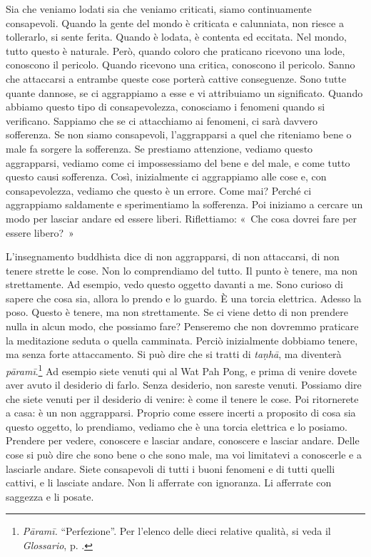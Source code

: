 Sia che veniamo lodati sia che veniamo criticati, siamo continuamente
consapevoli. Quando la gente del mondo è criticata e calunniata, non
riesce a tollerarlo, si sente ferita. Quando è lodata, è contenta ed
eccitata. Nel mondo, tutto questo è naturale. Però, quando coloro che
praticano ricevono una lode, conoscono il pericolo. Quando ricevono una
critica, conoscono il pericolo. Sanno che attaccarsi a entrambe queste
cose porterà cattive conseguenze. Sono tutte quante dannose, se ci
aggrappiamo a esse e vi attribuiamo un significato. Quando abbiamo
questo tipo di consapevolezza, conosciamo i fenomeni quando si
verificano. Sappiamo che se ci attacchiamo ai fenomeni, ci sarà davvero
sofferenza. Se non siamo consapevoli, l'aggrapparsi a quel che
riteniamo bene o male fa sorgere la sofferenza. Se prestiamo attenzione,
vediamo questo aggrapparsi, vediamo come ci impossessiamo del bene e del
male, e come tutto questo causi sofferenza. Così, inizialmente ci
aggrappiamo alle cose e, con consapevolezza, vediamo che questo è un
errore. Come mai? Perché ci aggrappiamo saldamente e sperimentiamo la
sofferenza. Poi iniziamo a cercare un modo per lasciar andare ed essere
liberi. Riflettiamo: «~Che cosa dovrei fare per essere libero?~»

L'insegnamento buddhista dice di non aggrapparsi, di non attaccarsi, di
non tenere strette le cose. Non lo comprendiamo del tutto. Il punto è
tenere, ma non strettamente. Ad esempio, vedo questo oggetto davanti a
me. Sono curioso di sapere che cosa sia, allora lo prendo e lo guardo. È
una torcia elettrica. Adesso la poso. Questo è tenere, ma non
strettamente. Se ci viene detto di non prendere nulla in alcun modo, che
possiamo fare? Penseremo che non dovremmo praticare la meditazione
seduta o quella camminata. Perciò inizialmente dobbiamo tenere, ma
senza forte attaccamento. Si può dire che si tratti di \emph{taṇhā}, ma
diventerà \emph{pāramī}.\footnote{\emph{Pāramī.} ``Perfezione''. Per
  l'elenco delle dieci relative qualità, si veda il \emph{Glossario}, p. \pageref{glossary-parami}.}
Ad esempio siete venuti qui al Wat Pah Pong, e prima di venire dovete
aver avuto il desiderio di farlo. Senza desiderio, non sareste venuti.
Possiamo dire che siete venuti per il desiderio di venire: è come il
tenere le cose. Poi ritornerete a casa: è un non aggrapparsi. Proprio
come essere incerti a proposito di cosa sia questo oggetto, lo
prendiamo, vediamo che è una torcia elettrica e lo posiamo. Prendere per
vedere, conoscere e lasciar andare, conoscere e lasciar andare. Delle
cose si può dire che sono bene o che sono male, ma voi limitatevi a
conoscerle e a lasciarle andare. Siete consapevoli di tutti i buoni
fenomeni e di tutti quelli cattivi, e li lasciate andare. Non li
afferrate con ignoranza. Li afferrate con saggezza e li posate.

